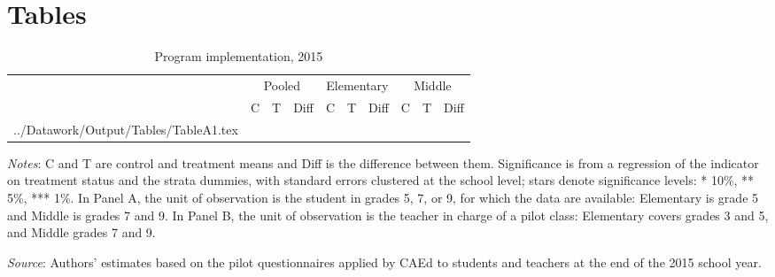 \documentclass[
	article,			%
	12pt,				%
	oneside,			%
	a4paper,			%
	]{article}
\makeatletter
\newcommand{\tablefragment}[1]{\@@input #1 }
\makeatother
\begin{document}

\appendix

\section{Tables}




\begin{table}[ht]
\centering
\begin{threeparttable}
\fontsize{8}{10}\selectfont
\setlength{\tabcolsep}{3.5pt}
\caption{Program implementation, 2015}\label{tab:implementation}
\begin{tabular*}{\textwidth}{@{\extracolsep{\fill}}l*{9}{c}@{}}
\toprule
 & \multicolumn{3}{c}{Pooled} & \multicolumn{3}{c}{Elementary} & \multicolumn{3}{c}{Middle} \\
\cmidrule(lr){2-4}\cmidrule(lr){5-7}\cmidrule(lr){8-10}
 & C & T & Diff & C & T & Diff & C & T & Diff \\
\midrule
\tablefragment{../Datawork/Output/Tables/TableA1.tex}
\bottomrule
\end{tabular*}
\begin{tablenotes}
\fontsize{8}{10}\selectfont
\item \textit{Notes}: C and T are control and treatment means and Diff is the difference between them. Significance is from a regression of the indicator on treatment status and the strata dummies, with standard errors clustered at the school level; stars denote significance levels: * 10\%, ** 5\%, *** 1\%. In Panel A, the unit of observation is the student in grades 5, 7, or 9, for which the data are available: Elementary is grade 5 and Middle is grades 7 and 9. In Panel B, the unit of observation is the teacher in charge of a pilot class: Elementary covers grades 3 and 5, and Middle grades 7 and 9.
\item \textit{Source}: Authors' estimates based on the pilot questionnaires applied by CAEd to students and teachers at the end of the 2015 school year.
\end{tablenotes}
\end{threeparttable}
\end{table}
\end{document}
